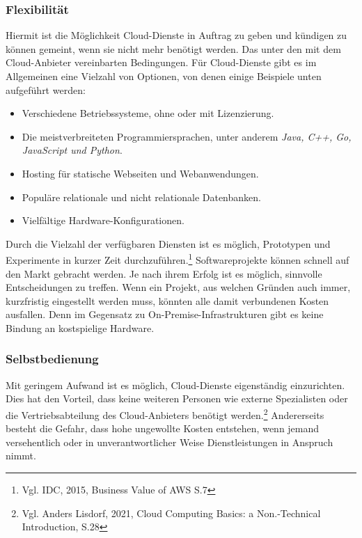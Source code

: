 \subsubsection{Flexibilität}%
Hiermit ist die Möglichkeit Cloud-Dienste in Auftrag zu geben und kündigen zu können gemeint, wenn sie nicht mehr benötigt werden. Das unter den mit dem Cloud-Anbieter vereinbarten Bedingungen.
Für Cloud-Dienste gibt es im Allgemeinen eine Vielzahl von Optionen, von denen einige Beispiele unten aufgeführt werden:
\begin{itemize}
\item
    Verschiedene Betriebssysteme, ohne oder mit Lizenzierung.
\item
    Die meistverbreiteten Programmiersprachen, unter anderem \textit{Java, C++, Go, JavaScript und Python}.{\cite{AMZ03}}
\item
    Hosting für statische Webseiten und Webanwendungen{\cite{AMZ04}}.
\item
    Populäre relationale und nicht relationale Datenbanken{\cite{AMZ10}}.           
\item
    Vielfältige Hardware-Konfigurationen.

\end{itemize}
\begin{flushleft}
Durch die Vielzahl der verfügbaren Diensten ist es möglich, Prototypen und Experimente in kurzer Zeit durchzuführen.\footnote{Vgl. IDC, 2015, Business Value of AWS S.7\cite{IDC01}} Softwareprojekte können schnell auf den Markt gebracht werden. Je nach ihrem Erfolg ist es möglich, sinnvolle Entscheidungen zu treffen. Wenn ein Projekt, aus welchen Gründen auch immer, kurzfristig eingestellt werden muss, könnten alle damit verbundenen Kosten ausfallen. Denn im Gegensatz zu On-Premise-Infrastrukturen gibt es keine Bindung an kostspielige Hardware.
\end{flushleft}

\subsubsection{Selbstbedienung}
Mit geringem Aufwand ist es möglich, Cloud-Dienste eigenständig einzurichten. Dies hat den Vorteil, dass keine weiteren Personen wie externe Spezialisten oder die Vertriebsabteilung des Cloud-Anbieters  benötigt werden.\footnote{Vgl. Anders Lisdorf, 2021, Cloud Computing Basics: a Non.-Technical Introduction, S.28\cite{CCB}}
Andererseits besteht die Gefahr, dass hohe ungewollte Kosten entstehen, wenn jemand versehentlich oder in unverantwortlicher Weise Dienstleistungen in Anspruch nimmt.    

